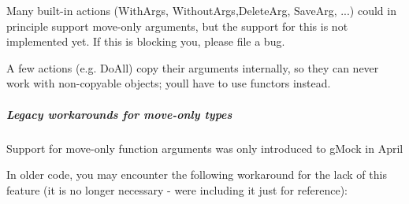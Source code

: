 \begin{DoxyCode}{0}
\DoxyCodeLine{}
\DoxyCodeLine{}
\end{DoxyCode}


Many built-\/in actions ({\ttfamily With\+Args}, {\ttfamily Without\+Args},{\ttfamily Delete\+Arg}, {\ttfamily Save\+Arg}, ...) could in principle support move-\/only arguments, but the support for this is not implemented yet. If this is blocking you, please file a bug.

A few actions (e.\+g. {\ttfamily Do\+All}) copy their arguments internally, so they can never work with non-\/copyable objects; you\textquotesingle{}ll have to use functors instead.

\label{md_build_googletest-src_googlemock_docs_CookBook_LegacyMoveOnly}%
%
\subparagraph*{Legacy workarounds for move-\/only types}

Support for move-\/only function arguments was only introduced to g\+Mock in April
\begin{DoxyEnumerate}
\item In older code, you may encounter the following workaround for the lack of this feature (it is no longer necessary -\/ we\textquotesingle{}re including it just for reference)\+:
\end{DoxyEnumerate}


\begin{DoxyCode}{0}
\DoxyCodeLine{ \textcolor{keyword}{public}:}
\DoxyCodeLine{  \}}
\DoxyCodeLine{\};}
\end{DoxyCode}


